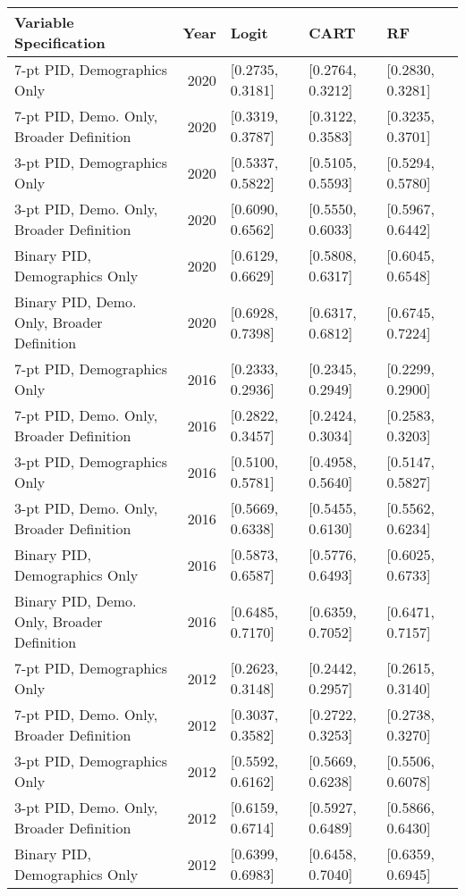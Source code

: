 \begin{longtable}{lrlll}
  \toprule
Variable Specification & Year & Logit & CART & RF \\ 
  \midrule
7-pt PID, Demographics Only & 2020 & [0.2735, 0.3181] & [0.2764, 0.3212] & [0.2830, 0.3281] \\ 
  7-pt PID, Demo. Only, Broader Definition & 2020 & [0.3319, 0.3787] & [0.3122, 0.3583] & [0.3235, 0.3701] \\ 
  3-pt PID, Demographics Only & 2020 & [0.5337, 0.5822] & [0.5105, 0.5593] & [0.5294, 0.5780] \\ 
  3-pt PID, Demo. Only, Broader Definition & 2020 & [0.6090, 0.6562] & [0.5550, 0.6033] & [0.5967, 0.6442] \\ 
  Binary PID, Demographics Only & 2020 & [0.6129, 0.6629] & [0.5808, 0.6317] & [0.6045, 0.6548] \\ 
  Binary PID, Demo. Only, Broader Definition & 2020 & [0.6928, 0.7398] & [0.6317, 0.6812] & [0.6745, 0.7224] \\ 
  7-pt PID, Demographics Only & 2016 & [0.2333, 0.2936] & [0.2345, 0.2949] & [0.2299, 0.2900] \\ 
  7-pt PID, Demo. Only, Broader Definition & 2016 & [0.2822, 0.3457] & [0.2424, 0.3034] & [0.2583, 0.3203] \\ 
  3-pt PID, Demographics Only & 2016 & [0.5100, 0.5781] & [0.4958, 0.5640] & [0.5147, 0.5827] \\ 
  3-pt PID, Demo. Only, Broader Definition & 2016 & [0.5669, 0.6338] & [0.5455, 0.6130] & [0.5562, 0.6234] \\ 
  Binary PID, Demographics Only & 2016 & [0.5873, 0.6587] & [0.5776, 0.6493] & [0.6025, 0.6733] \\ 
  Binary PID, Demo. Only, Broader Definition & 2016 & [0.6485, 0.7170] & [0.6359, 0.7052] & [0.6471, 0.7157] \\ 
  7-pt PID, Demographics Only & 2012 & [0.2623, 0.3148] & [0.2442, 0.2957] & [0.2615, 0.3140] \\ 
  7-pt PID, Demo. Only, Broader Definition & 2012 & [0.3037, 0.3582] & [0.2722, 0.3253] & [0.2738, 0.3270] \\ 
  3-pt PID, Demographics Only & 2012 & [0.5592, 0.6162] & [0.5669, 0.6238] & [0.5506, 0.6078] \\ 
  3-pt PID, Demo. Only, Broader Definition & 2012 & [0.6159, 0.6714] & [0.5927, 0.6489] & [0.5866, 0.6430] \\ 
  Binary PID, Demographics Only & 2012 & [0.6399, 0.6983] & [0.6458, 0.7040] & [0.6359, 0.6945] \\ 

\end{longtable}
